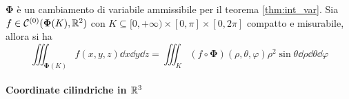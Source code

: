 $\bm\Phi$ è un cambiamento di variabile ammissibile per il teorema \ref{thm:int_var}. Sia $f \in \mathcal{C}^{(0)}(\bm\Phi(K),\mathbb{R}^2)$ con $K\subseteq[0,+\infty)\times[0,\pi]\times[0,2\pi]$ compatto e misurabile, allora si ha
$$\iiint_{\bm\Phi(K)}f(x,y,z)\dd x \dd y \dd z=\iiint_K(f\circ\bm\Phi)(\rho,\theta,\varphi)\rho^2\sin\theta  \dd \rho \dd \theta \dd \varphi$$

\paragraph{Coordinate cilindriche in $\mathbb{R}^3$}
